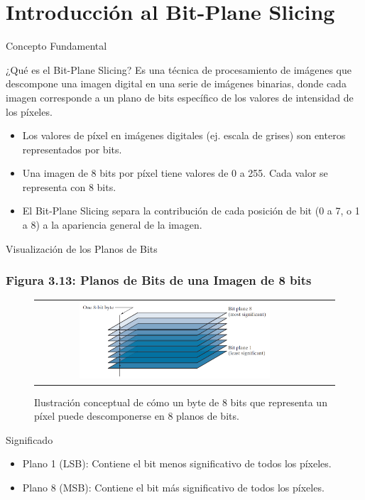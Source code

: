 \documentclass{beamer}
\begin{document}
\begin{frame}
  \titlepage
\end{frame}

\section{Introducción al Bit-Plane Slicing}

\begin{frame}{Concepto Fundamental}
  \begin{block}{¿Qué es el Bit-Plane Slicing?}
    Es una técnica de procesamiento de imágenes que descompone una imagen digital en una serie de imágenes binarias, donde cada imagen corresponde a un plano de bits específico de los valores de intensidad de los píxeles.
  \end{block}

  \begin{itemize}
    \item Los valores de píxel en imágenes digitales (ej. escala de grises) son enteros representados por bits.
    \item Una imagen de 8 bits por píxel tiene valores de 0 a 255. Cada valor se representa con 8 bits.
    \item El Bit-Plane Slicing separa la contribución de cada posición de bit (0 a 7, o 1 a 8) a la apariencia general de la imagen.
  \end{itemize}
\end{frame}

\begin{frame}{Visualización de los Planos de Bits}
  \frametitle{Figura 3.13: Planos de Bits de una Imagen de 8 bits}
  \begin{figure}
    \centering
    \begin{tabular}{ccc}
      \includegraphics[width=0.7\textwidth]{figuras/Fig_3_13.png}
    \end{tabular}
    \caption{Ilustración conceptual de cómo un byte de 8 bits que representa un píxel puede descomponerse en 8 planos de bits.}
  \end{figure}
  \begin{alertblock}{Significado}
    \begin{itemize}\footnotesize
      \item Plano 1 (LSB): Contiene el bit menos significativo de todos los píxeles.
      \item Plano 8 (MSB): Contiene el bit más significativo de todos los píxeles.
    \end{itemize}
  \end{alertblock}
\end{frame}
\end{document}
